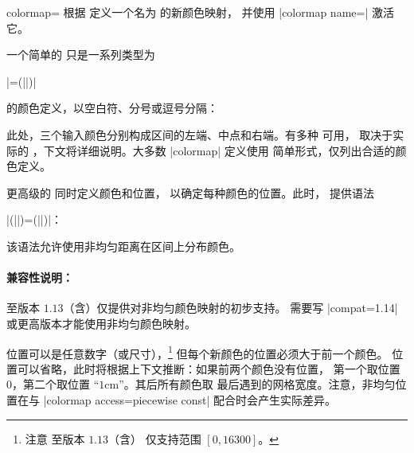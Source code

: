 \begin{pgfplotskey}{colormap=}
    根据  定义一个名为  的新颜色映射，
    并使用 |colormap name=| 激活它。

    一个简单的  只是一系列类型为

    |=(||)|

    的颜色定义，以空白符、分号或逗号分隔：
\begin{codeexample}
\end{codeexample}

    此处，三个输入颜色分别构成区间的左端、中点和右端。有多种
     可用， 取决于实际的
    ，下文将详细说明。大多数 |colormap| 定义使用
    简单形式，仅列出合适的颜色定义。

    更高级的  同时定义颜色和位置，
    以确定每种颜色的位置。此时，\PGFPlots{} 提供语法

    |(||)=(||)|：

\begin{codeexample}
\end{codeexample}

    该语法允许使用非均匀距离在区间上分布颜色。


    \paragraph{兼容性说明：}

    \PGFPlots{} 至版本 $1.13$（含）仅提供对非均匀颜色映射的初步支持。
    需要写 |compat=1.14| 或更高版本才能使用非均匀颜色映射。%

    位置可以是任意数字（或尺寸），\footnote{注意 \PGFPlots{} 至版本 $1.13$（含）
    仅支持范围 $[0,16300]$。} 但每个新颜色的位置必须大于前一个颜色。
    位置可以省略，此时将根据上下文推断：如果前两个颜色没有位置，
    第一个取位置~$0$，第二个取位置 ``$1\text{cm}$''。其后所有颜色取
    最后遇到的网格宽度。注意，非均匀位置在与
    |colormap access=piecewise const| 配合时会产生实际差异。


\end{pgfplotskey}
